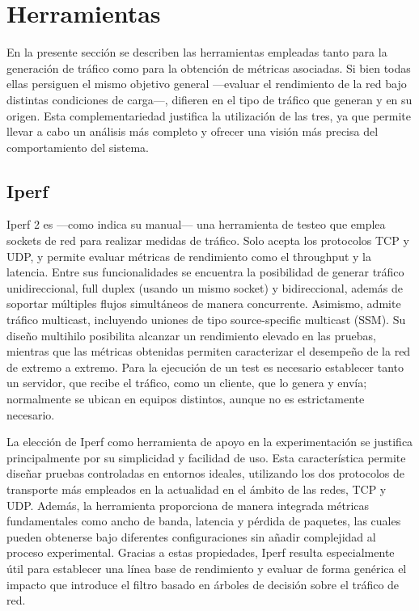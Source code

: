 \section{Herramientas}

En la presente sección se describen las herramientas empleadas tanto para la generación de tráfico como para la obtención de métricas asociadas. Si bien todas ellas persiguen el mismo objetivo general —evaluar el rendimiento de la red bajo distintas condiciones de carga—, difieren en el tipo de tráfico que generan y en su origen. Esta complementariedad justifica la utilización de las tres, ya que permite llevar a cabo un análisis más completo y ofrecer una visión más precisa del comportamiento del sistema.

\subsection{Iperf}

Iperf 2 es ---como indica su manual\cite{iperf2-manual}--- una herramienta de testeo que emplea sockets de red para realizar medidas de tráfico. Solo acepta los protocolos TCP y UDP, y permite evaluar métricas de rendimiento como el throughput y la latencia. Entre sus funcionalidades se encuentra la posibilidad de generar tráfico unidireccional, full duplex (usando un mismo socket) y bidireccional, además de soportar múltiples flujos simultáneos de manera concurrente. Asimismo, admite tráfico multicast, incluyendo uniones de tipo source-specific multicast (SSM). Su diseño multihilo posibilita alcanzar un rendimiento elevado en las pruebas, mientras que las métricas obtenidas permiten caracterizar el desempeño de la red de extremo a extremo. Para la ejecución de un test es necesario establecer tanto un servidor, que recibe el tráfico, como un cliente, que lo genera y envía; normalmente se ubican en equipos distintos, aunque no es estrictamente necesario.

La elección de Iperf como herramienta de apoyo en la experimentación se justifica principalmente por su simplicidad y facilidad de uso. Esta característica permite diseñar pruebas controladas en entornos ideales, utilizando los dos protocolos de transporte más empleados en la actualidad en el ámbito de las redes, TCP y UDP. Además, la herramienta proporciona de manera integrada métricas fundamentales como ancho de banda, latencia y pérdida de paquetes, las cuales pueden obtenerse bajo diferentes configuraciones sin añadir complejidad al proceso experimental. Gracias a estas propiedades, Iperf resulta especialmente útil para establecer una línea base de rendimiento y evaluar de forma genérica el impacto que introduce el filtro basado en árboles de decisión sobre el tráfico de red.


